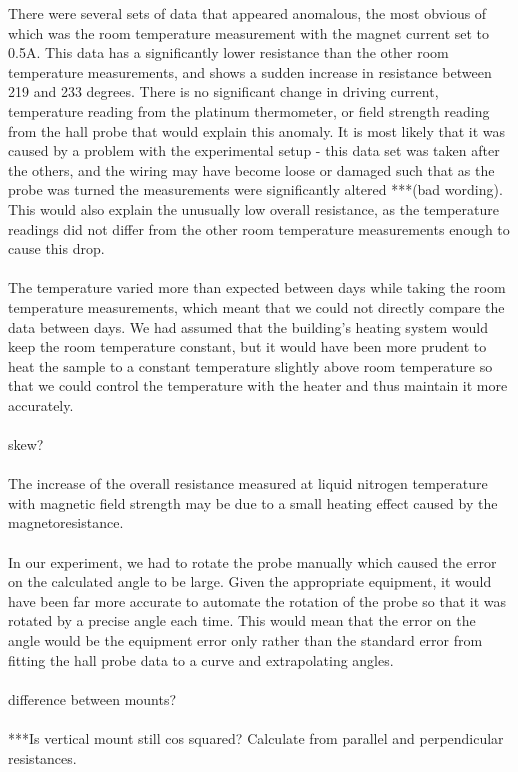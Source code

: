 \documentclass[10pt, twocolumn]{revtex4}
\begin{document}
There were several sets of data that appeared anomalous, the most obvious of which was the room temperature measurement with the magnet current set to 0.5A. This data has a significantly lower resistance than the other room temperature measurements, and shows a sudden increase in resistance between 219 and 233 degrees. There is no significant change in driving current, temperature reading from the platinum thermometer, or field strength reading from the hall probe that would explain this anomaly. It is most likely that it was caused by a problem with the experimental setup - this data set was taken after the others, and the wiring may have become loose or damaged such that as the probe was turned the measurements were significantly altered ***(bad wording). This would also explain the unusually low overall resistance, as the temperature readings did not differ from the other room temperature measurements enough to cause this drop. \\
\\
The temperature varied more than expected between days while taking the room temperature measurements, which meant that we could not directly compare the data between days. We had assumed that the building's heating system would keep the room temperature constant, but it would have been more prudent to heat the sample to a constant temperature slightly above room temperature so that we could control the temperature with the heater and thus maintain it more accurately. \\
\\
skew?\\
\\
The increase of the overall resistance measured at liquid nitrogen temperature with magnetic field strength may be due to a small heating effect caused by the magnetoresistance. \\
\\
In our experiment, we had to rotate the probe manually which caused the error on the calculated angle to be large. Given the appropriate equipment, it would have been far more accurate to automate the rotation of the probe so that it was rotated by a precise angle each time. This would mean that the error on the angle would be the equipment error only rather than the standard error from fitting the hall probe data to a curve and extrapolating angles.\\
\\
difference between mounts?\\
\\
***Is vertical mount still cos squared? Calculate from parallel and perpendicular resistances.\\
\end{document}
